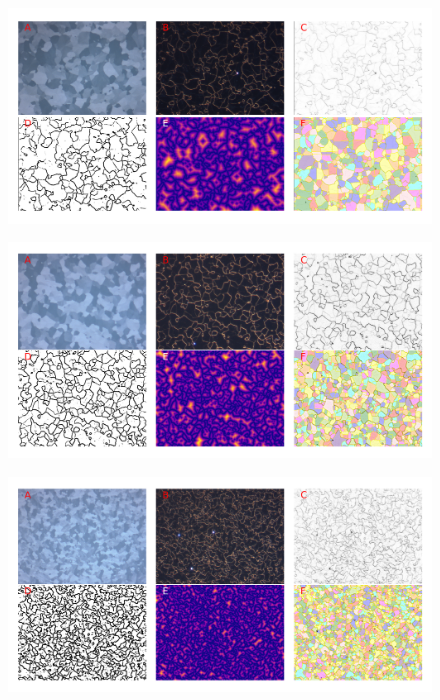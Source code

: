 \documentclass[12pt, titlepage]{article}
\begin{document}
	\begin{figure}[h]
		\centering
		\includegraphics[width=1.0\linewidth]{microstructure_10C.png}
		\caption{}
		\label{fig:micro_10C}
	\end{figure}

	\begin{figure}[h]
		\centering
		\includegraphics[width=1.0\linewidth]{microstructure_15C.png}
		\caption{}
		\label{fig:micro_15C}
	\end{figure}

	\begin{figure}[h]
		\centering
		\includegraphics[width=1.0\linewidth]{microstructure_20C.png}
		\caption{}
		\label{fig:micro_20C}
	\end{figure}
\end{document}
